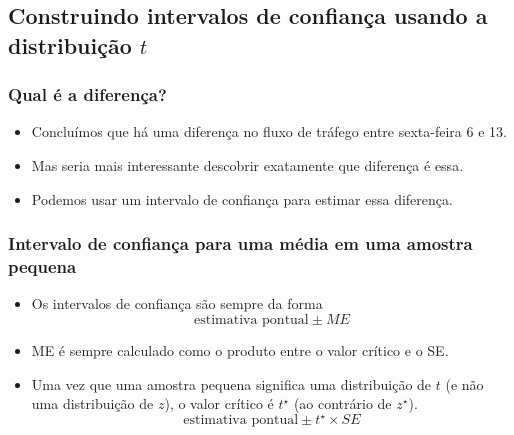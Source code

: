 
\subsection{Construindo intervalos de confiança usando a distribuição $t$}


\begin{frame}
\frametitle{Qual é a diferença?}

\begin{itemize}
\justifying
\item Concluímos que há uma diferença no fluxo de tráfego entre sexta-feira 6 e 13.

\pause
\justifying
\item Mas seria mais interessante descobrir exatamente que diferença é essa.

\pause
\justifying
\item Podemos usar um intervalo de confiança para estimar essa diferença.

\end{itemize}

\end{frame}


\begin{frame}
\frametitle{Intervalo de confiança para uma média em uma amostra pequena}

\begin{itemize}
\justifying
\item Os intervalos de confiança são sempre da forma
\[ \text{estimativa pontual} \pm {ME} \]

\pause
\justifying
\item ME é sempre calculado como o produto entre o valor crítico e o SE.

\pause
\justifying
\item Uma vez que uma amostra pequena significa uma distribuição de $t$ (e não uma distribuição de $z$), o valor crítico é $t^{\star}$ (ao contrário de $z^{\star}$).
\[ \text{estimativa pontual} \pm t^{\star} \times SE \]

\end{itemize}

\end{frame}


